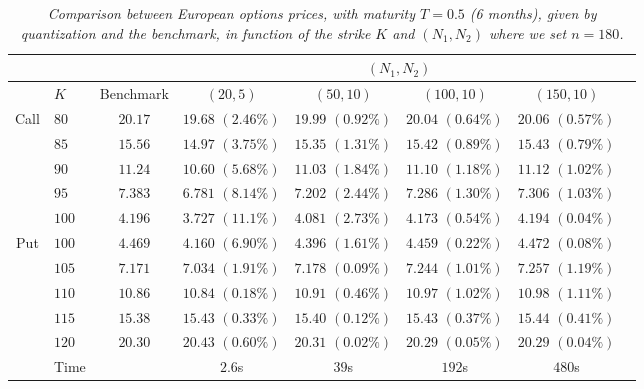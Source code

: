 \begin{table}[H]
	\centering
	\begin{tabular}{c|lcccccc}
		\toprule
		                        &       &           & \multicolumn{4}{c}{$(N_1,N_2)$}                                                                                 \\ \midrule
		                        & $K$   & Benchmark & $(20,5)$                        & $(50,10)$               & $(100,10)$              & $(150,10)$              & \\ \midrule \midrule
		\multirow{5}{2em}{Call} & $80$  & $20.17$   & $19.68 \, \, (2.46 \%)$         & $19.99 \, \, (0.92 \%)$ & $20.04 \, \, (0.64 \%)$ & $20.06 \, \, (0.57 \%)$ & \\
		                        & $85$  & $15.56$   & $14.97 \, \, (3.75 \%)$         & $15.35 \, \, (1.31 \%)$ & $15.42 \, \, (0.89 \%)$ & $15.43 \, \, (0.79 \%)$ & \\
		                        & $90$  & $11.24$   & $10.60 \, \, (5.68 \%)$         & $11.03 \, \, (1.84 \%)$ & $11.10 \, \, (1.18 \%)$ & $11.12 \, \, (1.02 \%)$ & \\
		                        & $95$  & $7.383$   & $6.781 \, \, (8.14 \%)$         & $7.202 \, \, (2.44 \%)$ & $7.286 \, \, (1.30 \%)$ & $7.306 \, \, (1.03 \%)$ & \\
		                        & $100$ & $4.196$   & $3.727 \, \, (11.1 \%)$         & $4.081 \, \, (2.73 \%)$ & $4.173 \, \, (0.54 \%)$ & $4.194 \, \, (0.04 \%)$ & \\ \midrule
		\multirow{6}{2em}{Put}  & $100$ & $4.469$   & $4.160 \, \, (6.90 \%)$         & $4.396 \, \, (1.61 \%)$ & $4.459 \, \, (0.22 \%)$ & $4.472 \, \, (0.08 \%)$ & \\
		                        & $105$ & $7.171$   & $7.034 \, \, (1.91 \%)$         & $7.178 \, \, (0.09 \%)$ & $7.244 \, \, (1.01 \%)$ & $7.257 \, \, (1.19 \%)$ & \\
		                        & $110$ & $10.86$   & $10.84 \, \, (0.18 \%)$         & $10.91 \, \, (0.46 \%)$ & $10.97 \, \, (1.02 \%)$ & $10.98 \, \, (1.11 \%)$ & \\
		                        & $115$ & $15.38$   & $15.43 \, \, (0.33 \%)$         & $15.40 \, \, (0.12 \%)$ & $15.43 \, \, (0.37 \%)$ & $15.44 \, \, (0.41 \%)$ & \\
		                        & $120$ & $20.30$   & $20.43 \, \, (0.60 \%)$         & $20.31 \, \, (0.02 \%)$ & $20.29 \, \, (0.05 \%)$ & $20.29 \, \, (0.04 \%)$ & \\ \bottomrule
		                        & Time  &           & $2.6$s                          & $39$s                   & $192$s                  & $480$s                  & \\ \bottomrule
	\end{tabular}
	\caption[Pricing of European options in a Stationary Heston model with product hybrid recursive quantization with time-step $n=180$.]{\textit{Comparison between European options prices, with maturity $T=0.5$ (6 months), given by quantization and the benchmark, in function of the strike $K$ and $(N_1,N_2)$ where we set $n=180$.}}
	\label{RH:tab:price_european_n_180}
\end{table}

